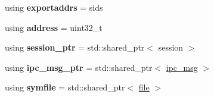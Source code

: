 \begin{DoxyCompactItemize}
using {\bfseries exportaddrs} = sids
\item 
\mbox{\label{namespaceeka2l1_adfd864e15d77afaa205818e8673edcc8}} 
using {\bfseries address} = uint32\+\_\+t
\item 
\mbox{\label{namespaceeka2l1_a61ea79ac92c68130d6f74ed5b4a44e64}} 
using {\bfseries session\+\_\+ptr} = std\+::shared\+\_\+ptr$<$ session $>$
\item 
\mbox{\label{namespaceeka2l1_a67b3e53820d609996991767498a81bff}} 
using {\bfseries ipc\+\_\+msg\+\_\+ptr} = std\+::shared\+\_\+ptr$<$ \mbox{\hyperlink{structeka2l1_1_1ipc__msg}{ipc\+\_\+msg}} $>$
\item 
\mbox{\label{namespaceeka2l1_a92ceee4657ff9024791df8b4156fe16b}} 
using {\bfseries symfile} = std\+::shared\+\_\+ptr$<$ \mbox{\hyperlink{structeka2l1_1_1file}{file}} $>$
\end{DoxyCompactItemize}
